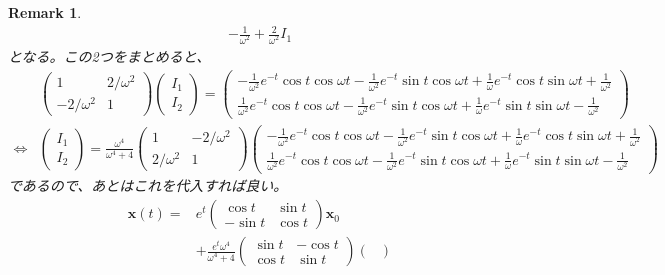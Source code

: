 \documentclass{jsarticle}
\newtheorem{remark}{Remark}
\begin{document}
\begin{remark}
\begin{align}
-\frac{1}{\omega^{2}}
+\frac{2}{\omega^{2}}I_{1}
\end{align}
となる。この2つをまとめると、
\begin{align}
&\begin{pmatrix}
1 & 2/\omega^{2}\\
-2/\omega^{2} & 1
\end{pmatrix}
\begin{pmatrix}
I_{1}\\
I_{2}
\end{pmatrix}
=
\begin{pmatrix}
-\frac{1}{\omega^{2}}e^{-t}\cos t\cos\omega t
-\frac{1}{\omega^{2}}e^{-t}\sin t\cos\omega t
+\frac{1}{\omega}e^{-t}\cos t\sin\omega t
+\frac{1}{\omega^{2}}\\
\frac{1}{\omega^{2}}e^{-t}\cos t\cos\omega t
-\frac{1}{\omega^{2}}e^{-t}\sin t\cos\omega t
+\frac{1}{\omega}e^{-t}\sin t\sin\omega t
-\frac{1}{\omega^{2}}
\end{pmatrix}
\\
\Leftrightarrow&
\begin{pmatrix}
I_{1}\\ I_{2}
\end{pmatrix}
=\frac{\omega^{4}}{\omega^{4}+4}
\begin{pmatrix}
1 & -2/\omega^{2}\\
2/\omega^{2} & 1
\end{pmatrix}
\begin{pmatrix}
-\frac{1}{\omega^{2}}e^{-t}\cos t\cos\omega t
-\frac{1}{\omega^{2}}e^{-t}\sin t\cos\omega t
+\frac{1}{\omega}e^{-t}\cos t\sin\omega t
+\frac{1}{\omega^{2}}\\
\frac{1}{\omega^{2}}e^{-t}\cos t\cos\omega t
-\frac{1}{\omega^{2}}e^{-t}\sin t\cos\omega t
+\frac{1}{\omega}e^{-t}\sin t\sin\omega t
-\frac{1}{\omega^{2}}
\end{pmatrix}
\end{align}
であるので、あとはこれを代入すれば良い。
\begin{align}
\boldsymbol{x}(t)=&e^{t}
\begin{pmatrix}
\cos t & \sin t\\
-\sin t & \cos t
\end{pmatrix}
\boldsymbol{x}_{0}\\
&+\frac{e^{t}\omega^{4}}{\omega^{4}+4}
\begin{pmatrix}
\sin t & -\cos t\\
\cos t & \sin t
\end{pmatrix}
\begin{pmatrix}

\end{pmatrix}
\end{align}
\end{remark}
\end{document}
